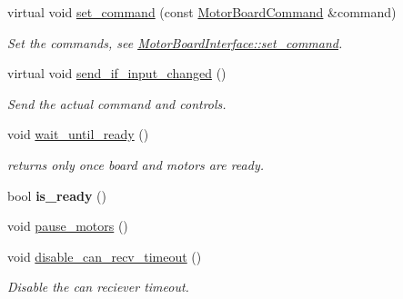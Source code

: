 \begin{DoxyCompactItemize}
virtual void \hyperlink{classblmc__drivers_1_1CanBusMotorBoard_a4bb9c1f7f59507feed145111ccffc625}{set\+\_\+command} (const \hyperlink{classblmc__drivers_1_1MotorBoardCommand}{Motor\+Board\+Command} \&command)
\begin{DoxyCompactList}\small\item\em Set the commands, see \hyperlink{classblmc__drivers_1_1MotorBoardInterface_a86b4ff810ca652d6761090ceaff65621}{Motor\+Board\+Interface\+::set\+\_\+command}. \end{DoxyCompactList}\item 
\mbox{\label{classblmc__drivers_1_1CanBusMotorBoard_a19ced11d06984528e6a2308c03ba83ac}} 
virtual void \hyperlink{classblmc__drivers_1_1CanBusMotorBoard_a19ced11d06984528e6a2308c03ba83ac}{send\+\_\+if\+\_\+input\+\_\+changed} ()
\begin{DoxyCompactList}\small\item\em Send the actual command and controls. \end{DoxyCompactList}\item 
\mbox{\label{classblmc__drivers_1_1CanBusMotorBoard_a3c496f045d3ef68c02fe6dd5abbdc4eb}} 
void \hyperlink{classblmc__drivers_1_1CanBusMotorBoard_a3c496f045d3ef68c02fe6dd5abbdc4eb}{wait\+\_\+until\+\_\+ready} ()
\begin{DoxyCompactList}\small\item\em returns only once board and motors are ready. \end{DoxyCompactList}\item 
\mbox{\label{classblmc__drivers_1_1CanBusMotorBoard_aecd2ba0d3d1f40ffd38a0fd47b8da55d}} 
bool {\bfseries is\+\_\+ready} ()
\item 
void \hyperlink{classblmc__drivers_1_1CanBusMotorBoard_a19ffd7d9ef9a441299164485e85ec6fd}{pause\+\_\+motors} ()
\item 
\mbox{\label{classblmc__drivers_1_1CanBusMotorBoard_a846382d2ad74d2087f5557ecd90937e3}} 
void \hyperlink{classblmc__drivers_1_1CanBusMotorBoard_a846382d2ad74d2087f5557ecd90937e3}{disable\+\_\+can\+\_\+recv\+\_\+timeout} ()
\begin{DoxyCompactList}\small\item\em Disable the can reciever timeout. \end{DoxyCompactList}\end{DoxyCompactItemize}
